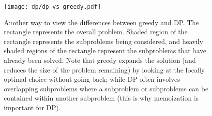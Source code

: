 \begin{figure}[htbp]
    \centering
    \texttt{[image: dp/dp-vs-greedy.pdf]}
    \caption{Another way to view the differences between greedy and DP. The rectangle represents the overall problem. Shaded region of the rectangle represents the subproblems being considered, and heavily shaded regions of the rectangle represent the subproblems that have already been solved. Note that greedy expands the solution (and reduces the size of the problem remaining) by looking at the locally optimal choice without going back; while DP often involves overlapping subproblems where a subproblem or subproblems can be contained within another subproblem (this is why memoization is important for DP).}
    \label{fig:greedy-vs-dp-set}
\end{figure}